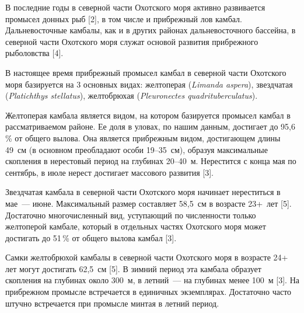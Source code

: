 



\makeProcTitleIIRazdel
{}



В последние годы в северной части Охотского моря активно развивается промысел донных рыб [2], в том числе и прибрежный лов камбал. Дальневосточные камбалы, как и в других районах дальневосточного бассейна, в северной части Охотского моря служат основой развития прибрежного рыболовства [4].

В настоящее время прибрежный промысел камбал в северной части Охотского моря базируется на 3 основных видах: желтоперая (\textit{Limanda aspera}), звездчатая (\textit{Platichthys stellatus}), желтобрюхая (\textit{Pleuronectes quad\-ri\-tu\-ber\-culatus}).

Желтоперая камбала является видом, на котором базируется промысел камбал в рассматриваемом районе. Ее доля в уловах, по нашим данным, достигает до 95,6\,\% от общего вылова. Она является прибрежным видом, достигающем длины 49~см (в основном преобладают особи 19--35~см), образуя максимальные скопления в нерестовый период на глубинах 20--40~м. Нерестится с конца мая по сентябрь, в июле нерест достигает массового развития [3].

Звездчатая камбала в северной части Охотского моря начинает нереститься в мае~--- июне. Максимальный размер составляет 58,5~см в возрасте 23+~лет [5]. Достаточно многочисленный вид, уступающий по численности только желтоперой камбале, который в отдельных частях Охотского моря может достигать до 51\,\% от общего вылова камбал [3].

Самки желтобрюхой камбалы в северной части Охотского моря в возрасте 24+ лет могут достигать 62,5~см [5]. В зимний период эта камбала образует скопления на глубинах около 300~м, в летний~--- на глубинах менее 100~м [3]. На прибрежном промысле встречается в единичных экземплярах. Достаточно часто штучно встречается при промысле минтая в летний период.

